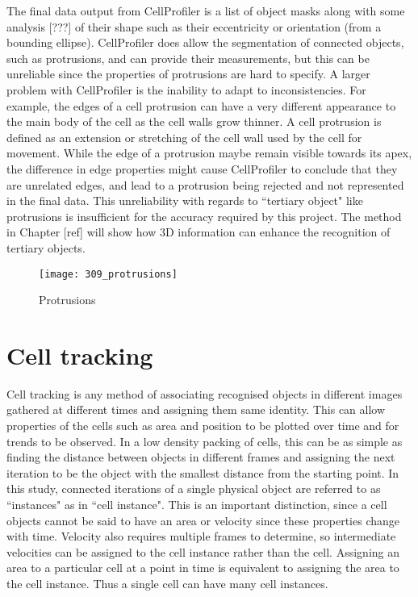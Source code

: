 The final data output from CellProfiler is a list of object masks along with some analysis [???] of their shape such as their eccentricity or orientation (from a bounding ellipse). CellProfiler does allow the segmentation of connected objects, such as protrusions, and can provide their measurements, but this can be unreliable since the properties of protrusions are hard to specify. A larger problem with CellProfiler is the inability to adapt to inconsistencies. For example, the edges of a cell protrusion can have a very different appearance to the main body of the cell as the cell walls grow thinner. A cell protrusion is defined as an extension or stretching of the cell wall used by the cell for movement. While the edge of a protrusion maybe remain visible towards its apex, the difference in edge properties might cause CellProfiler to conclude that they are unrelated edges, and lead to a protrusion being rejected and not represented in the final data. This unreliability with regards to ``tertiary object" like protrusions is insufficient for the accuracy required by this project. The method in Chapter [ref] will show how 3D information can enhance the recognition of tertiary objects.

\begin{figure}[p]
 \centering
 \texttt{[image: 309\_protrusions]}
 \caption{
 	Protrusions
 }
 \label{fig:cellprotrusions}
\end{figure}

\section{Cell tracking}

Cell tracking is any method of associating recognised objects in different images gathered at different times and assigning them same identity. This can allow properties of the cells such as area and position to be plotted over time and for trends to be observed. In a low density packing of cells, this can be as simple as finding the distance between objects in different frames and assigning the next iteration to be the object with the smallest distance from the starting point. In this study, connected iterations of a single physical object are referred to as ``instances" as in ``cell instance". This is an important distinction, since a cell objects cannot be said to have an area or velocity since these properties change with time. Velocity also requires multiple frames to determine, so intermediate velocities can be assigned to the cell instance rather than the cell. Assigning an area to a particular cell at a point in time is equivalent to assigning the area to the cell instance. Thus a single cell can have many cell instances.


